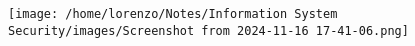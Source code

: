 \begin{enumerate}
\begin{minipage}{0.5\textwidth}
\begin{customquote}
        \end{customquote}
    \end{minipage} 
    \hspace{1cm}
    \begin{minipage}{0.3\textwidth}
        \centering
        \texttt{[image: /home/lorenzo/Notes/Information System Security/images/Screenshot from 2024-11-16 17-41-06.png]}
    \end{minipage}
\end{enumerate}
















